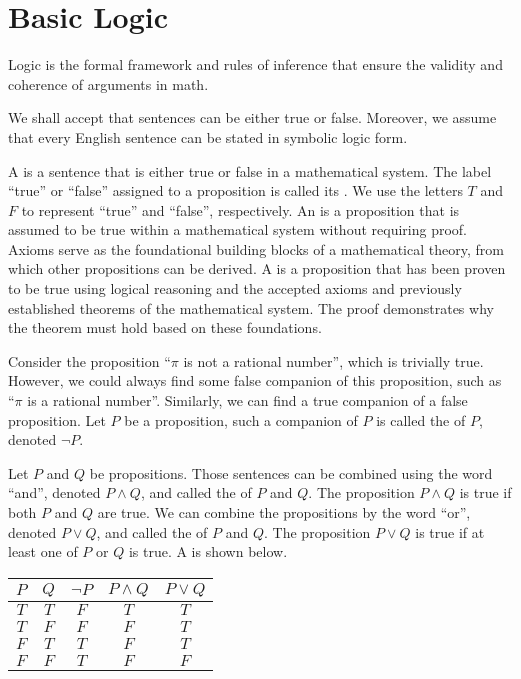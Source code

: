 \documentclass[10pt]{article}
\begin{document}
\section{Basic Logic}
Logic is the formal framework and rules of inference that ensure the validity and coherence of arguments in math.
\begin{remark}
    We shall accept that sentences can be either true or false. Moreover, we assume that every English sentence can be stated in symbolic logic form.
\end{remark} 
\par
A  is a sentence that is either true or false in a mathematical system. The label ``true'' or ``false'' assigned to a proposition is called its . We use the letters $T$ and $F$ to represent ``true'' and ``false'', respectively. An  is a proposition that is assumed to be true within a mathematical system without requiring proof. Axioms serve as the foundational building blocks of a mathematical theory, from which other propositions can be derived. A  is a proposition that has been proven to be true using logical reasoning and the accepted axioms and previously established theorems of the mathematical system. The proof demonstrates why the theorem must hold based on these foundations.
\par
Consider the proposition ``$\pi$ is not a rational number'', which is trivially true. However, we could always find some false companion of this proposition, such as ``$\pi$ is a rational number''. Similarly, we can find a true companion of a false proposition. Let $P$ be a proposition, such a companion of $P$ is called the  of $P$, denoted $\neg P$.
\par
Let $P$ and $Q$ be propositions. Those sentences can be combined using the word ``and'', denoted $P\wedge Q$, and called the  of $P$ and $Q$. The proposition $P\wedge Q$ is true if both $P$ and $Q$ are true. We can combine the propositions by the word ``or'', denoted $P\vee Q$, and called the  of $P$ and $Q$. The proposition $P\vee Q$ is true if at least one of $P$ or $Q$ is true. A  is shown below.
\begin{center}
    \begin{tabular}{cc|ccc}
        $P$ & $Q$ & $\neg P$ & $P\wedge Q$ & $P\vee Q$ \\
        \hline
        $T$ & $T$ & $F$ & $T$ & $T$ \\
        $T$ & $F$ & $F$ & $F$ & $T$ \\
        $F$ & $T$ & $T$ & $F$ & $T$ \\
        $F$ & $F$ & $T$ & $F$ & $F$ \\
    \end{tabular}
\end{center}
\end{document}
